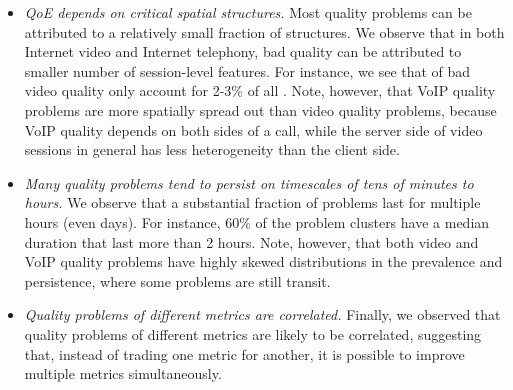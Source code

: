 \begin{itemize}

\item {\em QoE depends on critical spatial structures.}
Most quality problems can be attributed to 
a relatively small fraction of structures.
We observe that in both Internet video and Internet
telephony, bad quality can be attributed to smaller number
of session-level features. For instance, we
see that \criticalclusters of bad video quality only
account for 2-3\% of all \problemclusters.
Note, however, that VoIP quality problems are more 
spatially spread out than video quality problems, because 
VoIP quality depends
on both sides of a call, while the server side of video sessions 
in general has less heterogeneity than the client side.


\item {\em Many quality problems tend to 
persist on timescales of tens of minutes to hours.}
We observe that a substantial fraction of problems
last for multiple hours (even days).
For instance, 60\% of the problem clusters have a median
duration that last more than 2 hours.
Note, however, that both video and VoIP quality problems 
have highly skewed distributions in the prevalence 
and persistence, where some problems are still transit.


%

\item {\em Quality problems of different metrics are correlated.} Finally, we observed that
quality problems of different metrics are likely to be correlated,
suggesting that, instead of trading one metric for another,
it is possible to improve multiple metrics simultaneously.

\end{itemize}





